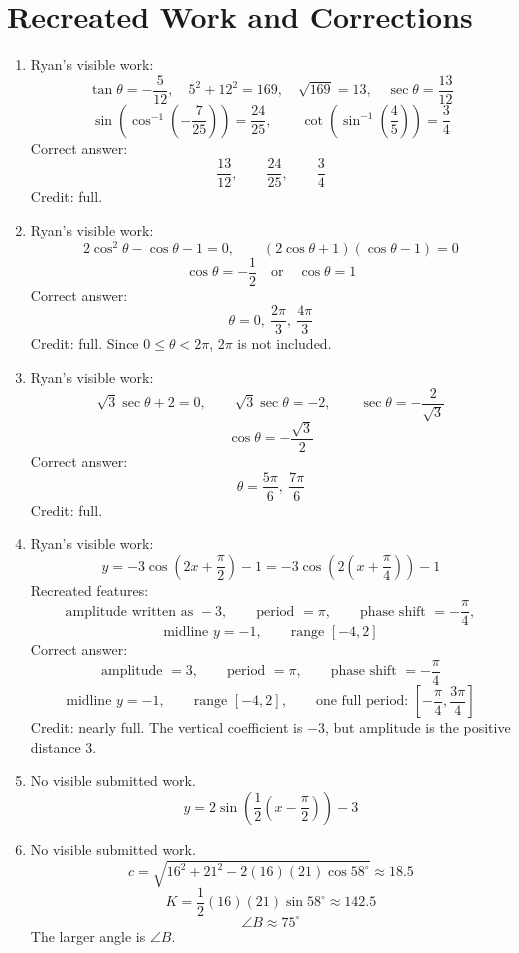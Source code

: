 \documentclass[11pt]{article}
\begin{document}
\section*{Recreated Work and Corrections}
\begin{enumerate}[leftmargin=*, itemsep=1.1em]
  \item Ryan's visible work:
  \[
  \tan\theta=-\frac{5}{12},\quad 5^2+12^2=169,\quad \sqrt{169}=13,
  \quad \sec\theta=\frac{13}{12}
  \]
  \[
  \sin\!\left(\cos^{-1}\!\left(-\frac{7}{25}\right)\right)=\frac{24}{25},
  \qquad
  \cot\!\left(\sin^{-1}\!\left(\frac45\right)\right)=\frac34
  \]
  Correct answer:
  \[
  \boxed{\frac{13}{12}},\qquad \boxed{\frac{24}{25}},\qquad \boxed{\frac34}
  \]
  Credit: full.

  \item Ryan's visible work:
  \[
  2\cos^2\theta-\cos\theta-1=0,\qquad
  (2\cos\theta+1)(\cos\theta-1)=0
  \]
  \[
  \cos\theta=-\frac12 \quad\text{or}\quad \cos\theta=1
  \]
  Correct answer:
  \[
  \boxed{\theta=0,\ \frac{2\pi}{3},\ \frac{4\pi}{3}}
  \]
  Credit: full. Since $0\le \theta<2\pi$, $2\pi$ is not included.

  \item Ryan's visible work:
  \[
  \sqrt3\sec\theta+2=0,\qquad
  \sqrt3\sec\theta=-2,\qquad
  \sec\theta=-\frac{2}{\sqrt3}
  \]
  \[
  \cos\theta=-\frac{\sqrt3}{2}
  \]
  Correct answer:
  \[
  \boxed{\theta=\frac{5\pi}{6},\ \frac{7\pi}{6}}
  \]
  Credit: full.

  \item Ryan's visible work:
  \[
  y=-3\cos\left(2x+\frac{\pi}{2}\right)-1
  =
  -3\cos\left(2\left(x+\frac{\pi}{4}\right)\right)-1
  \]
  Recreated features:
  \[
  \text{amplitude written as } -3,\qquad
  \text{period }=\pi,\qquad
  \text{phase shift }=-\frac{\pi}{4},
  \]
  \[
  \text{midline }y=-1,\qquad
  \text{range }[-4,2]
  \]
  Correct answer:
  \[
  \boxed{\text{amplitude }=3},\qquad
  \boxed{\text{period }=\pi},\qquad
  \boxed{\text{phase shift }=-\frac{\pi}{4}}
  \]
  \[
  \boxed{\text{midline }y=-1},\qquad
  \boxed{\text{range }[-4,2]},\qquad
  \boxed{\text{one full period: }\left[-\frac{\pi}{4},\frac{3\pi}{4}\right]}
  \]
  Credit: nearly full. The vertical coefficient is $-3$, but amplitude is the positive distance $3$.

  \item No visible submitted work.
  \[
  \boxed{y=2\sin\left(\frac12\left(x-\frac{\pi}{2}\right)\right)-3}
  \]

  \item No visible submitted work.
  \[
  c=\sqrt{16^2+21^2-2(16)(21)\cos58^\circ}\approx 18.5
  \]
  \[
  K=\frac12(16)(21)\sin58^\circ\approx 142.5
  \]
  \[
  \angle B\approx 75^\circ
  \]
  The larger angle is $\boxed{\angle B}$.


\end{enumerate}
\end{document}
